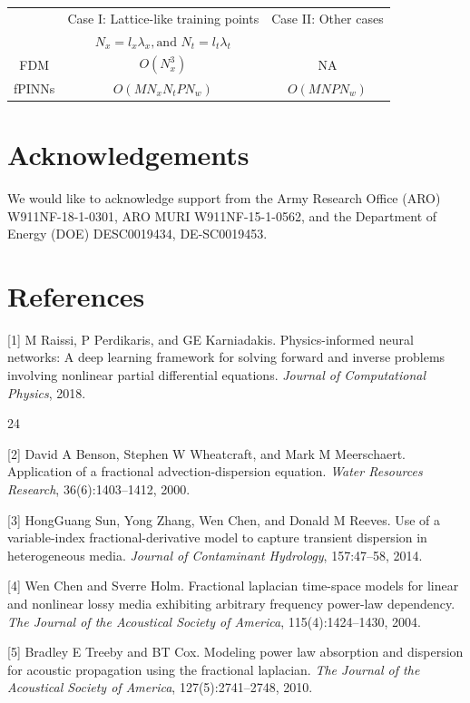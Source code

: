 \documentclass[UTF8]{article}
\begin{document}
\begin{center}
\begin{tabular}{c|c|c}
\hline
 & Case I: Lattice-like training points & Case II: Other cases \\
 & $N_x = l_x\lambda_x, \text{and } N_t = l_t\lambda_t$ & \\
\hline
FDM & $O(N_x^3)$ & NA \\
fPINNs & $O(MN_xN_tPN_w)$ & $O(MNPN_w)$ \\
\hline
\end{tabular}
\end{center}

\section*{Acknowledgements}
We would like to acknowledge support from the Army Research Office (ARO) W911NF-18-1-0301, ARO MURI W911NF-15-1-0562, and the Department of Energy (DOE) DESC0019434, DE-SC0019453.

\section*{References}
[1] M Raissi, P Perdikaris, and GE Karniadakis. Physics-informed neural networks: A deep learning framework for solving forward and inverse problems involving nonlinear partial differential equations. \textit{Journal of Computational Physics}, 2018.

\hfill 24

[2] David A Benson, Stephen W Wheatcraft, and Mark M Meerschaert. Application of a fractional advection-dispersion equation. \textit{Water Resources Research}, 36(6):1403--1412, 2000.

[3] HongGuang Sun, Yong Zhang, Wen Chen, and Donald M Reeves. Use of a variable-index fractional-derivative model to capture transient dispersion in heterogeneous media. \textit{Journal of Contaminant Hydrology}, 157:47--58, 2014.

[4] Wen Chen and Sverre Holm. Fractional laplacian time-space models for linear and nonlinear lossy media exhibiting arbitrary frequency power-law dependency. \textit{The Journal of the Acoustical Society of America}, 115(4):1424--1430, 2004.

[5] Bradley E Treeby and BT Cox. Modeling power law absorption and dispersion for acoustic propagation using the fractional laplacian. \textit{The Journal of the Acoustical Society of America}, 127(5):2741--2748, 2010.
\end{document}
